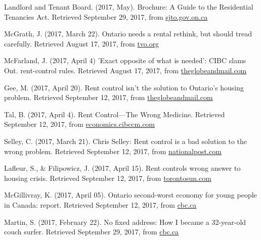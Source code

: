 \begin{thebibliography}{9}

 Landlord and Tenant Board. (2017, May). Brochure: A Guide to the Residential Tenancies Act. Retrieved September 29, 2017, from \href{http://www.sjto.gov.on.ca/documents/ltb/Brochures/Guide\%20to\%20RTA\%20(English).html}{sjto.gov.on.ca}

  McGrath, J. (2017, March 22). Ontario needs a rental rethink, but should tread carefully. Retrieved August 17, 2017, from \href{https://tvo.org/article/current-affairs/ontario-needs-a-rental-rethink-but-should-tread-carefully}{tvo.org}

  McFarland, J. (2017, April 4) 'Exact opposite of what is needed': CIBC slams Ont. rent-control rules. Retrieved August 17, 2017, from \href{https://www.theglobeandmail.com/real-estate/toronto/new-ontario-rent-control-rules-exact-opposite-of-what-is-needed-analyst-warns/article34569276/}{theglobeandmail.com}


 Gee, M. (2017, April 20). Rent control isn't the solution to Ontario's housing problem. Retrieved September 12, 2017, from \href{https://beta.theglobeandmail.com/news/toronto/rent-control-isnt-the-solution-to-ontarios-housing-problem/article34753102/}{theglobeandmail.com}

 Tal, B. (2017, April 4). Rent Control—The Wrong Medicine. Retrieved September 12, 2017, from \href{https://economics.cibccm.com/economicsweb/cds?ID=2595&TYPE=EC_PDF}{economics.cibccm.com}

 Selley, C. (2017, March 21). Chris Selley: Rent control is a bad solution to the wrong problem. Retrieved September 12, 2017, from \href{http://nationalpost.com/news/toronto/chris-selley-rent-control-is-a-bad-solution-to-the-wrong-problem}{nationalpost.com}

 Lafleur, S., \& Filipowicz, J. (2017, April 15). Rent controls wrong answer to housing crisis. Retrieved September 12, 2017, from \href{http://www.torontosun.com/2017/04/15/rent-controls-wrong-answer-to-housing-crisis}{torontosun.com}

  McGillivray, K. (2017, April 05). Ontario second-worst economy for young people in Canada: report. Retrieved September 12, 2017, from \href{http://www.cbc.ca/news/canada/toronto/generation-squeeze-ontario-economy-1.4054589}{cbc.ca}
  
  Martin, S. (2017, February 22). No fixed address: How I became a 32-year-old couch surfer. Retrieved September 29, 2017, from \href{http://www.cbc.ca/news/canada/toronto/no-fixed-address-how-i-became-a-32-year-old-couch-surfer-1.3985771}{cbc.ca}


\end{thebibliography}
